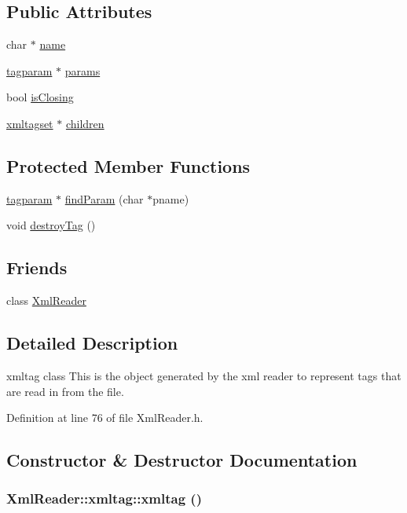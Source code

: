 \subsection*{Public Attributes}
\begin{CompactItemize}
\item 
char $\ast$ \hyperlink{classXmlReader_1_1xmltag_o0}{name}
\item 
\hyperlink{classXmlReader_1_1tagparam}{tagparam} $\ast$ \hyperlink{classXmlReader_1_1xmltag_o1}{params}
\item 
bool \hyperlink{classXmlReader_1_1xmltag_o2}{is\-Closing}
\item 
\hyperlink{classXmlReader_1_1xmltagset}{xmltagset} $\ast$ \hyperlink{classXmlReader_1_1xmltag_o3}{children}
\end{CompactItemize}
\subsection*{Protected Member Functions}
\begin{CompactItemize}
\item 
\hyperlink{classXmlReader_1_1tagparam}{tagparam} $\ast$ \hyperlink{classXmlReader_1_1xmltag_b0}{find\-Param} (char $\ast$pname)
\item 
void \hyperlink{classXmlReader_1_1xmltag_b1}{destroy\-Tag} ()
\end{CompactItemize}
\subsection*{Friends}
\begin{CompactItemize}
\item 
class \hyperlink{classXmlReader_1_1xmltag_n0}{Xml\-Reader}
\end{CompactItemize}


\subsection{Detailed Description}
xmltag class This is the object generated by the xml reader to represent tags that are read in from the file. 



Definition at line 76 of file Xml\-Reader.h.

\subsection{Constructor \& Destructor Documentation}
\hypertarget{classXmlReader_1_1xmltag_a0}{
\subsubsection[xmltag]{\setlength{\rightskip}{0pt plus 5cm}Xml\-Reader::xmltag::xmltag ()}}
\label{classXmlReader_1_1xmltag_a0}




